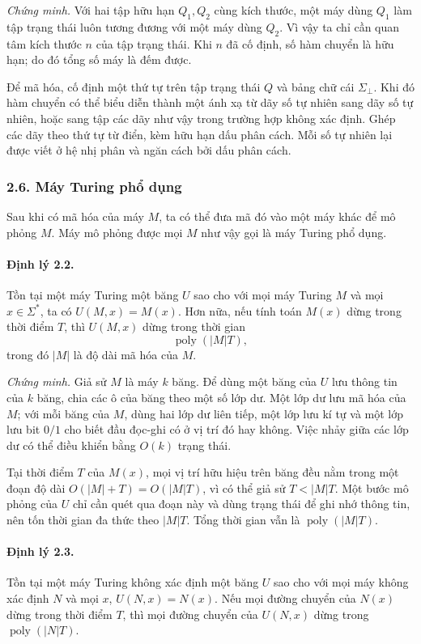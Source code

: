 \documentclass[11pt]{article}
\begin{document}
\emph{Chứng minh.}
Với hai tập hữu hạn \(Q_1,Q_2\) cùng kích thước, một máy dùng \(Q_1\) làm tập
trạng thái luôn tương đương với một máy dùng \(Q_2\). Vì vậy ta chỉ cần quan
tâm kích thước \(n\) của tập trạng thái. Khi \(n\) đã cố định, số hàm chuyển là
hữu hạn; do đó tổng số máy là đếm được.

Để mã hóa, cố định một thứ tự trên tập trạng thái \(Q\) và bảng chữ cái
\(\Sigma_{\bot}\). Khi đó hàm chuyển có thể biểu diễn thành một ánh xạ từ dãy
số tự nhiên sang dãy số tự nhiên, hoặc sang tập các dãy như vậy trong trường
hợp không xác định. Ghép các dãy theo thứ tự từ điển, kèm hữu hạn dấu phân
cách. Mỗi số tự nhiên lại được viết ở hệ nhị phân và ngăn cách bởi dấu phân
cách.

\subsubsection*{2.6. Máy Turing phổ dụng}

Sau khi có mã hóa của máy \(M\), ta có thể đưa mã đó vào một máy khác để mô
phỏng \(M\). Máy mô phỏng được mọi \(M\) như vậy gọi là máy Turing phổ dụng.

\paragraph{Định lý 2.2.}
Tồn tại một máy Turing một băng \(U\) sao cho với mọi máy Turing \(M\) và mọi
\(x\in\Sigma^*\), ta có \(U(M,x)=M(x)\). Hơn nữa, nếu tính toán \(M(x)\) dừng
trong thời điểm \(T\), thì \(U(M,x)\) dừng trong thời gian
\[
  \operatorname{poly}(|M|T),
\]
trong đó \(|M|\) là độ dài mã hóa của \(M\).

\emph{Chứng minh.}
Giả sử \(M\) là máy \(k\) băng. Để dùng một băng của \(U\) lưu thông tin của
\(k\) băng, chia các ô của băng theo một số lớp dư. Một lớp dư lưu mã hóa của
\(M\); với mỗi băng của \(M\), dùng hai lớp dư liên tiếp, một lớp lưu kí tự và
một lớp lưu bit \(0/1\) cho biết đầu đọc-ghi có ở vị trí đó hay không. Việc
nhảy giữa các lớp dư có thể điều khiển bằng \(O(k)\) trạng thái.

Tại thời điểm \(T\) của \(M(x)\), mọi vị trí hữu hiệu trên băng đều nằm trong
một đoạn độ dài \(O(|M|+T)=O(|M|T)\), vì có thể giả sử \(T<|M|T\). Một bước mô
phỏng của \(U\) chỉ cần quét qua đoạn này và dùng trạng thái để ghi nhớ thông
tin, nên tốn thời gian đa thức theo \(|M|T\). Tổng thời gian vẫn là
\(\operatorname{poly}(|M|T)\).

\paragraph{Định lý 2.3.}
Tồn tại một máy Turing không xác định một băng \(U\) sao cho với mọi máy không
xác định \(N\) và mọi \(x\), \(U(N,x)=N(x)\). Nếu mọi đường chuyển của \(N(x)\)
dừng trong thời điểm \(T\), thì mọi đường chuyển của \(U(N,x)\) dừng trong
\(\operatorname{poly}(|N|T)\).
\end{document}

